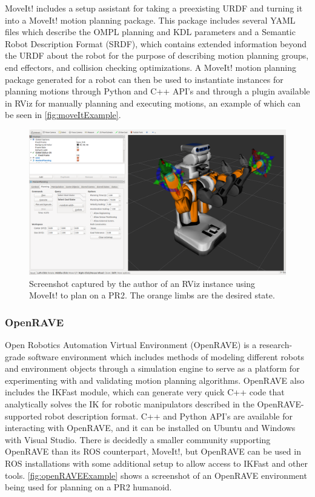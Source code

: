 \documentclass[12pt]{report}
\makeatletter
\renewcommand{\todo}[2][]{%
    \@todo[caption={#2}, #1]{\begin{spacing}{0.5}#2\end{spacing}}%
}
\makeatother
\begin{document}
MoveIt! includes a setup assistant for taking a preexisting URDF and turning it into a MoveIt! motion planning package. This package includes several YAML files which describe the OMPL planning and KDL parameters and a Semantic Robot Description Format (SRDF), which contains extended information beyond the URDF about the robot for the purpose of describing motion planning groups, end effectors, and collision checking optimizations. A MoveIt! motion planning package generated for a robot can then be used to instantiate instances for planning motions through Python and C++ API's and through a plugin available in RViz for manually planning and executing motions, an example of which can be seen in \autoref{fig:moveItExample}.

\begin{figure}[thpb]
	\centering
	\includegraphics[width=\textwidth]{images/moveit_rviz.png}
    \caption{Screenshot captured by the author of an RViz instance using MoveIt! to plan on a PR2. The orange limbs are the desired state.}
    \label{fig:moveItExample}
\end{figure}

\subsubsection{OpenRAVE}
Open Robotics Automation Virtual Environment (OpenRAVE) is a research-grade software environment which includes methods of modeling different robots and environment objects through a simulation engine to serve as a platform for experimenting with and validating motion planning algorithms. \todo{cite.} OpenRAVE also includes the IKFast module, which can generate very quick C++ code that analytically solves the IK for robotic manipulators described in the OpenRAVE-supported robot description format. \todo{cite} C++ and Python API's are available for interacting with OpenRAVE, and it can be installed on Ubuntu and Windows with Visual Studio. There is decidedly a smaller community supporting OpenRAVE than its ROS counterpart, MoveIt!, but OpenRAVE can be used in ROS installations with some additional setup to allow access to IKFast and other tools. \autoref{fig:openRAVEExample} shows a screenshot of an OpenRAVE environment being used for planning on a PR2 humanoid.
\end{document}
